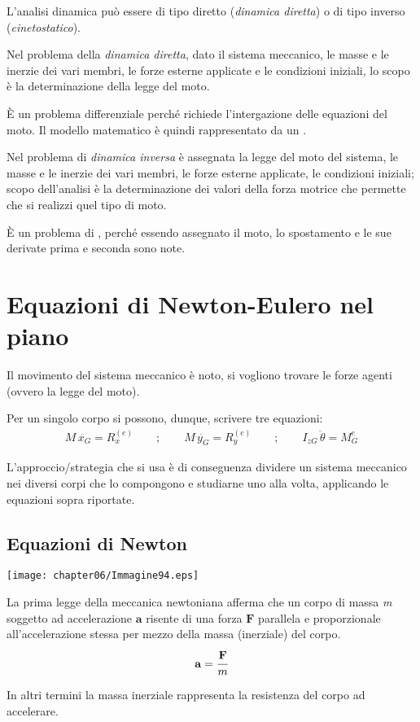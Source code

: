 L'analisi dinamica può essere di tipo diretto (\emph{dinamica diretta}) o di tipo inverso (\emph{cinetostatico}).\newline

Nel problema della \emph{dinamica diretta}, dato il sistema meccanico, le masse e le inerzie dei vari membri, le forze esterne applicate e le condizioni iniziali, lo scopo è la determinazione della legge del moto.

È un problema differenziale perché richiede l'intergazione delle equazioni del moto. Il modello matematico è quindi rappresentato da un .\newline

Nel problema di \emph{dinamica inversa} è assegnata la legge del moto del sistema, le masse e le inerzie dei vari membri, le forze esterne applicate, le condizioni iniziali; scopo dell'analisi è la determinazione dei valori della forza motrice che permette che si realizzi quel tipo di moto. 

È un problema di , perché essendo assegnato il moto, lo spostamento e le sue derivate prima e seconda sono note.
	
	\section{Equazioni di Newton-Eulero nel piano}
	
	Il movimento del sistema meccanico è noto, si vogliono trovare le forze agenti (ovvero la legge del moto).
	
	Per un singolo corpo si possono, dunque, scrivere tre equazioni:
	\begin{gather*}
	M\,\ddot{x_G} = R_x^{(e)}\qquad;\qquad M\,\ddot{y_G} = R_y^{(e)}\qquad;\qquad I_{zG}\,\ddot{\theta} = M_G^e
	\end{gather*}
	
	L'approccio/strategia che si usa è di conseguenza dividere un sistema meccanico nei diversi corpi che lo compongono e studiarne uno alla volta, applicando le equazioni sopra riportate.

		\subsection{Equazioni di Newton}
	
	\begin{minipage}{.3\textwidth}
	\centering
	\texttt{[image: chapter06/Immagine94.eps]}
	\end{minipage}
	\hfill
	\begin{minipage}{.65\textwidth}
	 La prima legge della meccanica newtoniana afferma che un corpo di massa \emph{m} soggetto ad accelerazione $\mathbf{a}$ risente di una forza $\mathbf{F}$ parallela e proporzionale all'accelerazione stessa per mezzo della massa (inerziale) del corpo.
	 \[
	 \mathbf{a} = \cfrac{\mathbf{F}}{m}
	 \]
	 
	 In altri termini la massa inerziale rappresenta la resistenza del corpo ad accelerare.
	\end{minipage}
	
